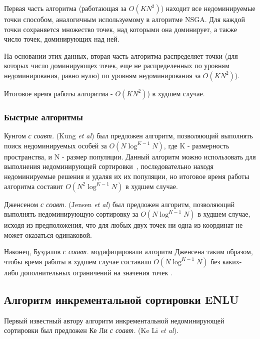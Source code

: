 Первая часть алгоритма (работающая за $O(KN^2)$) находит все недоминируемые точки способом,
аналогичным используемому в алгоритме NSGA. Для каждой точки сохраняется множество точек,
над которыми она доминирует, а также число точек, доминирующих над ней.

На основании этих данных, вторая часть алгоритма распределяет точки (для которых число
доминирующех точек, еще не распределенных по уровням недоминирования, равно нулю) по уровням
недоминирования за $O(KN^2)$).

Итоговое время работы алгоритма - $O(KN^2)$) в худшем случае.

\subsubsection{Быстрые алгоритмы}
Кунгом \textit{с соавт.} (Kung \textit{et al}) \cite{kung} был предложен алгоритм, позволяющий 
выполнять поиск недоминируемых особей за $O(N \log^{K - 1} N)$, где K - размерность пространства, 
и N - размер популяции. Данный алгоритм можно использовать для выполнения недоминирующей сортировки~\cite{max_me_ss_nsga2}, 
последовательно находя недоминируемые решения и удаляя их их популяции, но итоговое время работы
алгоритма составит $O(N^2 \log^{K - 1} N)$ в худшем случае.

Дженсеном \textit{с соавт.} (Jensen \textit{et al}) \cite{jensen} был предложен алгоритм, позволяющий 
выполнять недоминирующую сортировку за $O(N \log^{K - 1} N)$ в худшем случае, исходя из предположения,
что для любых двух точек ни одна из координат не может оказаться одинаковой.

Наконец, Буздалов \textit{с соавт.} модифицировали алгоритм Дженсена таким образом, чтобы
время работы в худшем случае составило $O(N \log^{K - 1} N)$ без каких-либо дополнительных ограничений
на значения точек \cite{max_sort}.

\subsection{Алгоритм инкрементальной сортировки ENLU}
Первый известный автору алгоритм инкрементальной недоминирующей сортировки был предложен
Ке Ли \textit{с соавт.} (Ke Li \textit{et al}). \cite{enlu}

